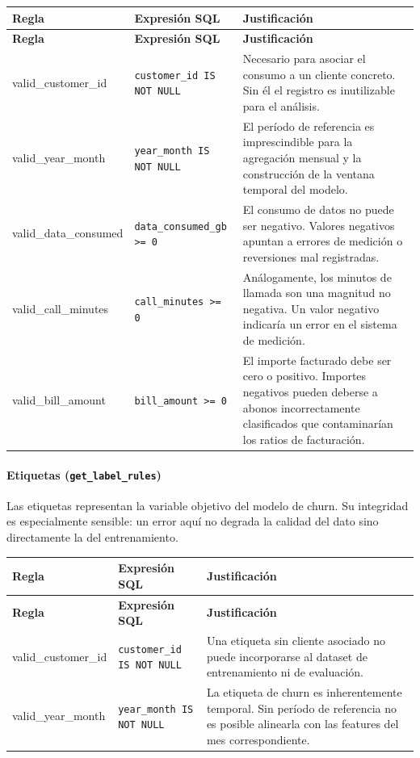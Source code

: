 \documentclass[12pt,a4paper]{article}
\begin{document}
\begin{longtable}{>{\ttfamily}p{4.2cm} p{5.5cm} p{5.5cm}}
\toprule
\textbf{Regla} & \textbf{Expresión SQL} & \textbf{Justificación} \\
\midrule
\endfirsthead
\toprule
\textbf{Regla} & \textbf{Expresión SQL} & \textbf{Justificación} \\
\midrule
\endhead
\bottomrule
\endlastfoot
valid\_customer\_id & \texttt{customer\_id IS NOT NULL} & Necesario para asociar el consumo a un cliente concreto. Sin él el registro es inutilizable para el análisis. \\[4pt]
valid\_year\_month & \texttt{year\_month IS NOT NULL} & El período de referencia es imprescindible para la agregación mensual y la construcción de la ventana temporal del modelo. \\[4pt]
valid\_data\_consumed & \texttt{data\_consumed\_gb >= 0} & El consumo de datos no puede ser negativo. Valores negativos apuntan a errores de medición o reversiones mal registradas. \\[4pt]
valid\_call\_minutes & \texttt{call\_minutes >= 0} & Análogamente, los minutos de llamada son una magnitud no negativa. Un valor negativo indicaría un error en el sistema de medición. \\[4pt]
valid\_bill\_amount & \texttt{bill\_amount >= 0} & El importe facturado debe ser cero o positivo. Importes negativos pueden deberse a abonos incorrectamente clasificados que contaminarían los ratios de facturación. \\
\end{longtable}

\paragraph{Etiquetas (\texttt{get\_label\_rules})}

Las etiquetas representan la variable objetivo del modelo de churn. Su integridad es especialmente sensible: un error aquí no degrada la calidad del dato sino directamente la del entrenamiento.

\begin{longtable}{>{\ttfamily}p{4.2cm} p{5.5cm} p{5.5cm}}
\toprule
\textbf{Regla} & \textbf{Expresión SQL} & \textbf{Justificación} \\
\midrule
\endfirsthead
\toprule
\textbf{Regla} & \textbf{Expresión SQL} & \textbf{Justificación} \\
\midrule
\endhead
\bottomrule
\endlastfoot
valid\_customer\_id & \texttt{customer\_id IS NOT NULL} & Una etiqueta sin cliente asociado no puede incorporarse al dataset de entrenamiento ni de evaluación. \\[4pt]
valid\_year\_month & \texttt{year\_month IS NOT NULL} & La etiqueta de churn es inherentemente temporal. Sin período de referencia no es posible alinearla con las features del mes correspondiente. \\
\end{longtable}
\end{document}
